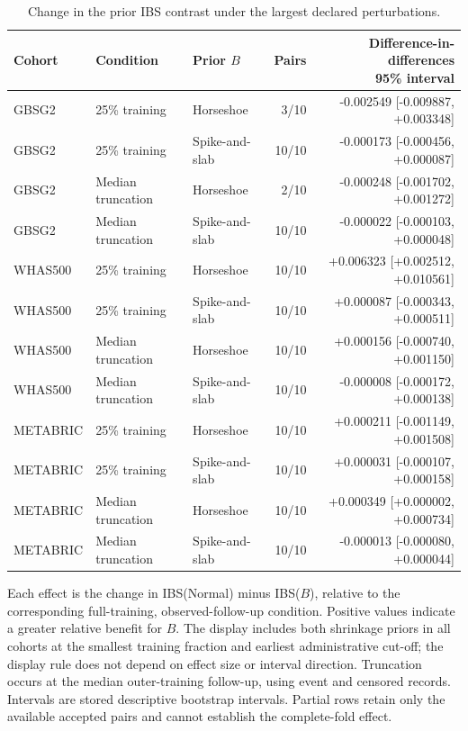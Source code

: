 \begin{table}[p]
\centering
\footnotesize
\setlength{\tabcolsep}{3pt}
\caption{Change in the prior IBS contrast under the largest declared perturbations.}
\label{tab:report-information}
\begin{tabular}{@{}lllrr@{}}
\toprule
Cohort & Condition & Prior $B$ & Pairs & \shortstack[r]{Difference-in-differences\\95\% interval}\\
\midrule
GBSG2 & 25\% training & Horseshoe & 3/10 & -0.002549 [-0.009887, +0.003348]\\
GBSG2 & 25\% training & Spike-and-slab & 10/10 & -0.000173 [-0.000456, +0.000087]\\
GBSG2 & Median truncation & Horseshoe & 2/10 & -0.000248 [-0.001702, +0.001272]\\
GBSG2 & Median truncation & Spike-and-slab & 10/10 & -0.000022 [-0.000103, +0.000048]\\
WHAS500 & 25\% training & Horseshoe & 10/10 & +0.006323 [+0.002512, +0.010561]\\
WHAS500 & 25\% training & Spike-and-slab & 10/10 & +0.000087 [-0.000343, +0.000511]\\
WHAS500 & Median truncation & Horseshoe & 10/10 & +0.000156 [-0.000740, +0.001150]\\
WHAS500 & Median truncation & Spike-and-slab & 10/10 & -0.000008 [-0.000172, +0.000138]\\
METABRIC & 25\% training & Horseshoe & 10/10 & +0.000211 [-0.001149, +0.001508]\\
METABRIC & 25\% training & Spike-and-slab & 10/10 & +0.000031 [-0.000107, +0.000158]\\
METABRIC & Median truncation & Horseshoe & 10/10 & +0.000349 [+0.000002, +0.000734]\\
METABRIC & Median truncation & Spike-and-slab & 10/10 & -0.000013 [-0.000080, +0.000044]\\
\bottomrule
\end{tabular}
\par\smallskip
\begin{minipage}{\textwidth}\footnotesize Each effect is the change in IBS(Normal) minus IBS($B$), relative to the corresponding full-training, observed-follow-up condition. Positive values indicate a greater relative benefit for $B$. The display includes both shrinkage priors in all cohorts at the smallest training fraction and earliest administrative cut-off; the display rule does not depend on effect size or interval direction. Truncation occurs at the median outer-training follow-up, using event and censored records. Intervals are stored descriptive bootstrap intervals. Partial rows retain only the available accepted pairs and cannot establish the complete-fold effect.\end{minipage}
\end{table}
